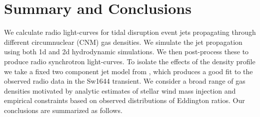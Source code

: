 \documentclass[usenatbib,fleqn]{mnras}
\begin{document}
\section{Summary and Conclusions}
\label{sec:conc}

We calculate radio light-curves for tidal disruption event jets
propagating through different circumnuclear (CNM) gas densities. We
simulate the jet propagation using both 1d and 2d hydrodynamic
simulations. We then post-process these to produce radio synchrotron
light-curves. To isolate the effects of the density profile we take a
fixed two component jet model from \citet{Mimica+2015}, which produces
a good fit to the observed radio data in the Sw1644 transient. We
consider a broad range of gas densities motivated by analytic
estimates of stellar wind mass injection and empirical constraints
based on observed distributions of Eddington ratios. Our conclusions
are summarized as follows.
\end{document}
